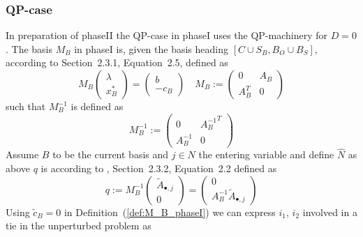 \documentclass[a4paper]{article}
\begin{document}
\subsubsection{QP-case}
In preparation of phaseII the QP-case in phaseI uses the QP-machinery for $D=0$.
The basis $M_{B}$ in phaseI is, given the basis heading
$\left[C \cup S_{B}, B_{O} \cup B_{S} \right]$,
according to \cite{Sven} Section~2.3.1, Equation~2.5, defined as
\begin{equation}
\label{def:M_B_phaseI}
M_{B}
\left(\begin{array}{c}
        \lambda \\
	\hline
	x_{B}^{*}
      \end{array}
\right)
=
\left(\begin{array}{c}
        b \\
	\hline
	-c_{B}
       \end{array}
\right)
\quad
M_{B}:=
\left(\begin{array}{c|c}
        0 & A_{B} \\
	\hline
	A_{B}^{T} & 0 
       \end{array}
\right)
\end{equation}
such that $M_{B}^{-1}$ is defined as
\begin{equation}
\label{def:M_B_inv_phaseI}
M_{B}^{-1}:=
\left(\begin{array}{c|c}
        0 & {A_{B}^{-1}}^{T} \\
	\hline
	A_{B}^{-1} & 0
       \end{array}
\right)
\end{equation}
Assume $B$ to be the current basis and $j \in N$ the entering variable and
define $\hat{N}$ as above $q$ is according to \cite{Sven}, Section~2.3.2,
Equation~2.2 defined as
\begin{equation}
\label{def:q_phaseI}
q:= M_{B}^{-1}
\left(\begin{array}{c}
        \tilde{A}_{\bullet, j} \\
	\hline
        0
      \end{array}
\right)
=
\left(\begin{array}{c}
        0 \\
	\hline
	A_{B}^{-1}\tilde{A}_{\bullet, j}
       \end{array}
\right)
\end{equation}
Using $\tilde{c}_{B}=0$ in Definition~(\ref{def:M_B_phaseI})
we can express $i_{1}$, $i_{2}$ involved in a tie in the unperturbed problem
as
\end{document}
